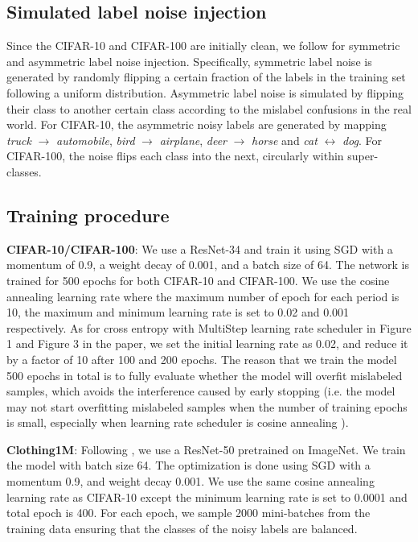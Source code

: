 \documentclass{article}
\begin{document}
\subsection{Simulated label noise injection}
\label{apd:noise_inject}
Since the CIFAR-10 and CIFAR-100 are initially clean, we follow \cite{tanaka2018joint,patrini2017making} for symmetric and asymmetric label noise injection. Specifically, symmetric label noise is generated by randomly flipping a certain fraction of the labels in the training set following a uniform distribution. Asymmetric label noise is simulated by flipping their class to another certain class according to the mislabel confusions in the real world. For CIFAR-10, the asymmetric noisy labels are generated by mapping \emph{truck} $\rightarrow$ \emph{automobile}, \emph{bird} $\rightarrow$ \emph{airplane}, \emph{deer} $\rightarrow$ \emph{horse} and \emph{cat} $\leftrightarrow$ \emph{dog}. For CIFAR-100, the noise flips each class into the next, circularly within super-classes.

\subsection{Training procedure}
\textbf{CIFAR-10/CIFAR-100}: We use a ResNet-34 and train it using SGD with a momentum of 0.9, a weight decay of 0.001, and a batch size of 64. The network is trained for 500 epochs for both CIFAR-10 and CIFAR-100. We use the cosine annealing learning rate \cite{loshchilov2016sgdr} where the maximum number of epoch for each period is 10, the maximum and minimum learning rate is set to 0.02 and 0.001 respectively. As for cross entropy with MultiStep learning rate scheduler  in Figure 1 and Figure 3 in the paper, we set the initial learning rate as 0.02, and reduce it by a factor of 10 after 100 and 200 epochs. The reason that we train the model 500 epochs in total is to fully evaluate whether the model will overfit mislabeled samples, which avoids the interference caused by early stopping \cite{li2020gradient} (i.e. the model may not start overfitting mislabeled samples when the number of training epochs is small, especially when learning rate scheduler is cosine annealing \cite{loshchilov2016sgdr}). 

\textbf{Clothing1M}: Following \cite{xiao2015learning,wang2019symmetric}, we use a ResNet-50 pretrained on ImageNet. We train the model with batch size 64. The optimization is done using SGD with a momentum 0.9, and weight decay 0.001. We use the same cosine annealing learning rate as CIFAR-10 except the minimum learning rate is set to 0.0001 and total epoch is 400. For each epoch, we sample 2000 mini-batches from the training data ensuring that the classes of the noisy labels are balanced.
\end{document}
